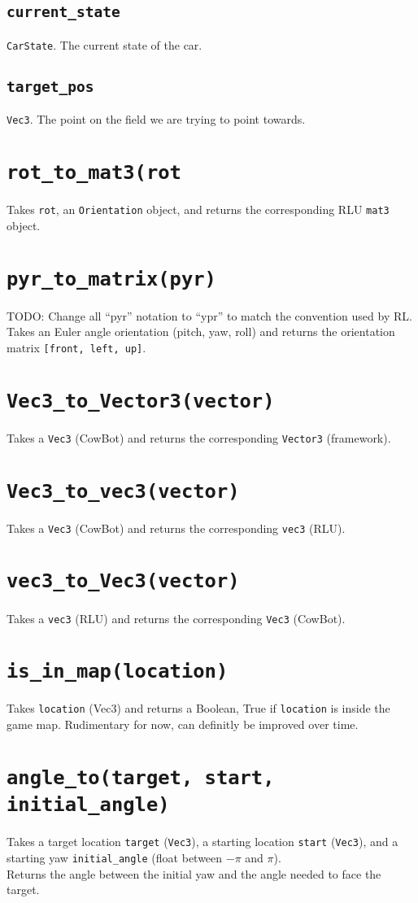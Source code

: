 \documentclass{article}
\newcommand{\function}[1]{\section{\texttt{#1}}}
\newcommand{\argumenta}[1]{\subsection{\texttt{#1}}}
\begin{document}
\begin{flushleft}
{           \argumenta{current\_state}
                     {
                       \texttt{CarState}.  The current state of the car.
                     }
                     


           \argumenta{target\_pos}
                     {
                       \texttt{Vec3}. The point on the field we are trying to point towards.
                     }
                     
         }
         



\function{rot\_to\_mat3(rot}
         {
           Takes \texttt{rot}, an \texttt{Orientation} object, and returns the corresponding RLU \texttt{mat3} object.
         }




\function{pyr\_to\_matrix(pyr)}
         {
           TODO: Change all ``pyr'' notation to ``ypr'' to match the convention used by RL.\\
           Takes an Euler angle orientation (pitch, yaw, roll) and returns the orientation matrix \texttt{[front, left, up]}.
         }




\function{Vec3\_to\_Vector3(vector)}
         {
           Takes a \texttt{Vec3} (CowBot) and returns the corresponding \texttt{Vector3} (framework).
         }


         
         
\function{Vec3\_to\_vec3(vector)}
         {
           Takes a \texttt{Vec3} (CowBot) and returns the corresponding \texttt{vec3} (RLU).
         }

         

\function{vec3\_to\_Vec3(vector)}
         {
           Takes a \texttt{vec3} (RLU) and returns the corresponding \texttt{Vec3} (CowBot).
         }






\function{is\_in\_map(location)}      
         {
           Takes \texttt{location} (Vec3) and returns a Boolean, True if \texttt{location} is inside the game map.  Rudimentary for now, can definitly be improved over time.
         }



\function{angle\_to(target, start, initial\_angle)}
         {
           Takes a target location \texttt{target} (\texttt{Vec3}), a starting location \texttt{start} (\texttt{Vec3}), and a starting yaw \texttt{initial\_angle} (float between $-\pi$ and $\pi$).\\
           Returns the angle between the initial yaw and the angle needed to face the target.
         }






\end{flushleft}
\end{document}
